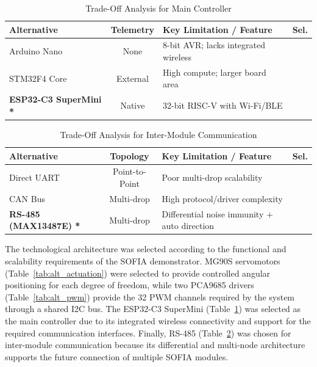 \documentclass[lettersize,journal]{IEEEtran}
\begin{document}
	\begin{table}[!t]
		\centering
		\caption{Trade-Off Analysis for Main Controller}
		\label{tab:alt_processing}
		\scriptsize
		\setlength{\tabcolsep}{3pt}
		\renewcommand{\arraystretch}{1.1}
		\begin{tabularx}{\columnwidth}{@{}l c X c@{}}
			\toprule
			\textbf{Alternative} & \textbf{Telemetry} & \textbf{Key Limitation / Feature} & \textbf{Sel.} \\
			\midrule
			Arduino Nano \cite{atmega328p} & None & 8-bit AVR; lacks integrated wireless & \\
			STM32F4 Core \cite{stm32f4} & External & High compute; larger board area & \\
			\textbf{ESP32-C3 SuperMini \cite{esp32c3}*} & Native & 32-bit RISC-V with Wi-Fi/BLE & \checkmark \\
			\bottomrule
		\end{tabularx}
	\end{table}
	
	\begin{table}[!t]
		\centering
		\caption{Trade-Off Analysis for Inter-Module Communication}
		\label{tab:alt_comm}
		\scriptsize
		\setlength{\tabcolsep}{3pt}
		\renewcommand{\arraystretch}{1.1}
		\begin{tabularx}{\columnwidth}{@{}l c X c@{}}
			\toprule
			\textbf{Alternative} & \textbf{Topology} & \textbf{Key Limitation / Feature} & \textbf{Sel.} \\
			\midrule
			Direct UART \cite{esp32c3} & Point-to-Point & Poor multi-drop scalability & \\
			CAN Bus \cite{sn65hvd230} & Multi-drop & High protocol/driver complexity & \\
			\textbf{RS-485 (MAX13487E) \cite{max13487e}*} & Multi-drop & Differential noise immunity + auto direction & \checkmark \\
			\bottomrule
		\end{tabularx}
	\end{table}
	
	The technological
	architecture was selected according to the functional and scalability
	requirements of the SOFIA demonstrator. 
	MG90S servomotors (Table~\ref{tab:alt_actuation}) were selected to provide controlled angular positioning for each degree of freedom,
	while two PCA9685 drivers (Table~\ref{tab:alt_pwm}) provide the 32 PWM channels required by the system through a shared I2C bus. The ESP32-C3 SuperMini (Table~\ref{tab:alt_processing}) was selected as the main controller due to its integrated wireless connectivity and support for the required communication interfaces. Finally, RS-485 (Table~\ref{tab:alt_comm}) was chosen for inter-module communication because its differential and multi-node architecture supports the future connection of multiple
	SOFIA modules.
	
\end{document}
